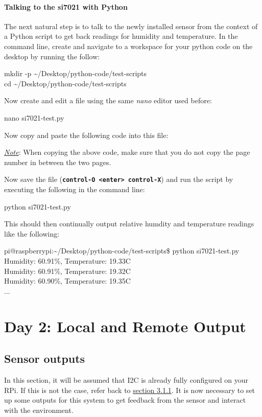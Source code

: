 \documentclass{article}
\newcommand*{\myfont}{\fontfamily{pcr}\selectfont}
\newcommand{\codeb}[2]{
  \begin{tcolorbox}[width=\textwidth,colback={SpringGreen},title={#1},colbacktitle=darkgreen,coltitle=SpringGreen]
    \myfont
    #2
  \end{tcolorbox}
} %
\newcommand{\outputb}[2]{
  \begin{tcolorbox}[width=\textwidth,colback={light-gray},title={#1},colbacktitle=gray,coltitle=light-gray]
    \myfont
    #2
  \end{tcolorbox}
} %
\begin{document}
  \paragraph{Talking to the si7021 with Python}
    The next natural step is to talk to the newly installed sensor from the context of a Python script to get back readings for humidity and temperature. In the command line, create and navigate to a workspace for your python code on the desktop by running the follow:
    \codeb{Create and navigate to your workspace}
    {
      mkdir -p \textasciitilde/Desktop/python-code/test-scripts \\
      cd \textasciitilde/Desktop/python-code/test-scripts
    }
    \noindent
    Now create and edit a file using the same \textit{nano} editor used before:
    \codeb{Create si7021 Python testing script file}
    {
      nano si7021-test.py
    }
    \noindent
    Now copy and paste the following code into this file:
    
    \underline{\textit{Note}}: When copying the above code, make sure that you do not copy the page number in between the two pages.

    \newline

    \newline

    \noindent
    Now save the file (\textbf{\texttt{control-O <enter> control-X}}) and run the script by executing the following in the command line:
    \codeb{Run the test script for si7021 sensor}{python si7021-test.py}
    This should then continually output relative humdity and temperature readings like the following:
    \outputb{Test script output for si7021 sensor}
    {
      pi@raspberrypi:\textasciitilde/Desktop/python-code/test-scripts\$ python si7021-test.py        \\
      Humidity: 60.91\%, Temperature: 19.33\degree C                                   \\
      Humidity: 60.91\%, Temperature: 19.32\degree C                                   \\
      Humidity: 60.90\%, Temperature: 19.35\degree C                                   \\
      ...
    }
    
\section{Day 2: Local and Remote Output}
\subsection{Sensor outputs}
  In this section, it will be assumed that I2C is already fully configured on your RPi. If this is not the case, refer back to \hyperref[sec:configuring-i2c]{section 3.1.1}. It is now necessary to set up some outputs for this system to get feedback from the sensor and interact with the environment.
\end{document}
